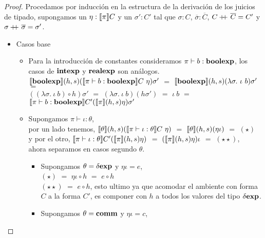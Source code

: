 \begin{proof}
Procedamos por inducci\'on en la estructura de la derivaci\'on de los juicios de tipado,
supongamos un $\eta : \llbracket \pi \rrbracket C$ y un $\sigma' : C'$ tal que $\sigma : C$,
$\overline{\sigma} : \overline{C}$, $C +\kern-1.3ex+\kern0.8ex \overline{C} = C'$ y 
$\sigma +\kern-1.3ex+\kern0.8ex \overline{\sigma} = \sigma'$.

\begin{itemize}

\item Casos base
\begin{itemize}
\item Para la introducci\'on de constantes consideramos $\pi \vdash b : \textbf{boolexp}$, los
casos de $\textbf{intexp}$ y $\textbf{realexp}$ son an\'alogos.\\

$\llbracket \textbf{boolexp} \rrbracket(h,s)(\llbracket \pi \vdash b : \textbf{boolexp} \rrbracket C \ \eta) \sigma'$ $=$
$\semBrcks{\boolexp}(h,s)(\lambda \sigma. \ \iota \ b) \sigma'$ $=$ \\
$((\lambda \sigma. \ \iota \ b) \circ h)\sigma'$ $=$
$(\lambda \sigma. \ \iota \ b) (h \sigma')$ $=$
$\iota \ b$ $=$ $\llbracket \pi \vdash b : \textbf{boolexp} \rrbracket C'(\llbracket \pi \rrbracket(h,s)\eta)\sigma'$

\item Supongamos $\pi \vdash \iota : \theta$,\\

por un lado tenemos,
$\llbracket \theta \rrbracket(h,s)(\llbracket \pi \vdash \iota : \theta \rrbracket C \ \eta)$ $=$
$\llbracket \theta \rrbracket(h,s)(\eta \iota)$ $=$ $(\star)$ \\

y por el otro, $\llbracket \pi \vdash \iota : \theta \rrbracket C'(\llbracket \pi \rrbracket(h,s)\eta)$ $=$
$(\llbracket \pi \rrbracket(h,s)\eta) \iota$ $=$ $(\star \star)$,\\

ahora separamos en casos segundo $\theta$.

\begin{itemize}
\item Supongamos $\theta = \delta \textbf{exp}$ y $\eta\iota = e$, \\

$(\star)$ $=$ $\eta\iota \circ h$ $=$ $e \circ h$\\

$(\star\star)$ $=$ $e \circ h$, esto ultimo ya que acomodar el ambiente con forma
$C$ a la forma $C'$, es componer con $h$ a todos los valores del tipo $\delta \textbf{exp}$.

\item Supongamos $\theta = \textbf{comm}$ y $\eta\iota = c$,\\


\end{itemize}
\end{itemize}
\end{itemize}
\end{proof}
